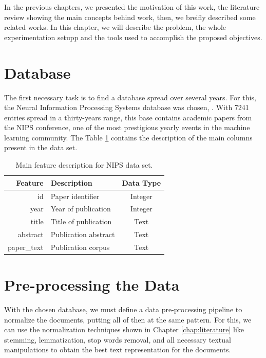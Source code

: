 In the previous chapters, we presented the motivation of this work, the literature review showing the main concepts behind work, then, we breifly described some related works. In this chapter, we will describe the problem, the whole experimentation setupp and the tools used to accomplish the proposed objectives.

\section{Database}

The first necessary task is to find a database spread over several years. For this, the Neural Information Processing Systems database was chosen, \cite{nipsweb}. With 7241 entries spread in a thirty-years range, this base contains academic papers from the NIPS conference, one of the most prestigious yearly events in the machine learning community. The Table \ref{tab:dataset-description} contains the description of the main columns present in the data set.

\begin{table}[h!]
	\centering
	\caption{Main feature description for NIPS data set.}
	\label{tab:dataset-description}
	\begin{tabular}{r|lc}
		    Feature & Description          & Data Type \\ \hline
		         id & Paper identifier     &  Integer  \\
		       year & Year of publication  &  Integer  \\
		      title & Title of publication &   Text    \\
		   abstract & Publication abstract &   Text    \\
		paper\_text & Publication corpus   &   Text
	\end{tabular}
\end{table}

\section{Pre-processing the Data}

With the chosen database, we must define a data pre-processing pipeline to normalize the documents, putting all of then at the same pattern. For this, we can use the normalization techniques shown in Chapter \ref{chap:literature} like stemming, lemmatization, stop words removal, and all necessary textual manipulations to obtain the best text representation for the documents.

